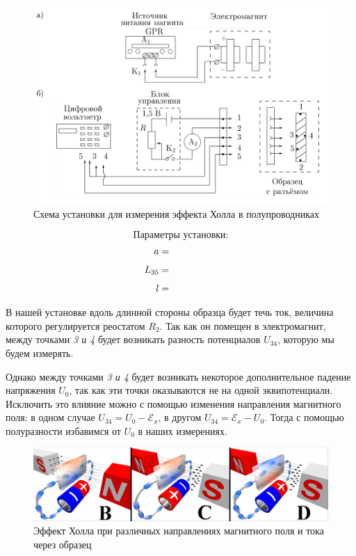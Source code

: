 \documentclass{physlab}
\begin{document}
\begin{figure}
\includegraphics[width = 0.7 \textwidth]{Scheme1.png}
			\caption{Схема установки для измерения эффекта Холла в полупроводниках}
\end{figure} 

$$\text{Параметры установки:}$$
\begin{align*}
a &= \val \\[1ex]
L_{35} &= \val \\[1ex]
l &= \val
\end{align*}
\vspace{5.7 cm}

В нашей установке вдоль длинной стороны образца будет течь ток, величина которого регулируется реостатом $R_2$. Так как он помещен в электромагнит, между точками \textit{3 и 4} будет возникать разность потенциалов $U_{34}$, которую мы будем измерять. 

Однако между точками \textit{3 и 4} будет возникать некоторое дополнительное падение напряжения $U_{0}$, так как эти точки оказываются не на одной эквипотенциали. Исключить это влияние можно с помощью изменения направления магнитного поля: в одном случае $U_{34} = U_{0} - \mathscr{E}_x $, в другом  $U_{34} = \mathscr{E}_x - U_0$. Тогда с помощью полуразности избавимся от $U_{0}$ в наших измерениях. 

\begin{figure}[H]
	\begin{center}
		\includegraphics[width = 0.6 \textwidth]{Hall_dif}
		\caption{Эффект Холла при различных направлениях магнитного поля и тока через образец}
	\end{center}
\end{figure}
\end{document}
